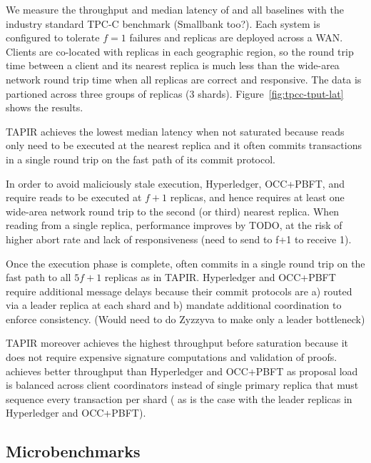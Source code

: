We measure the throughput and median latency of \sys{} and all baselines with the
industry standard TPC-C benchmark (Smallbank too?). Each system is configured to tolerate $f=1$
failures and replicas are deployed across a WAN. Clients are co-located with
replicas in each geographic region, so the round trip time between a client and
its nearest replica is much less than the wide-area network round trip time when
all replicas are correct and responsive. The data is partioned across
three groups of replicas (3 shards). Figure~\ref{fig:tpcc-tput-lat} shows the results.

TAPIR achieves the lowest median latency when not saturated because reads only
need to be executed at the nearest replica and it often commits transactions in
a single round trip on the fast path of its commit protocol.

In order to avoid maliciously stale execution, Hyperledger, OCC+PBFT, and \sys{} require reads to be executed at $f+1$ replicas, and hence requires at least one wide-area network round trip
to the second (or third) nearest replica. When reading from a single replica, performance improves by TODO, at the risk of higher abort rate and lack of responsiveness (need to send to f+1 to receive 1).

Once the execution phase is complete,
\sys{} often commits in a single round trip on the fast path to all $5f+1$
replicas as in TAPIR. Hyperledger and OCC+PBFT require additional message delays
because their commit protocols are a) routed via a leader replica at each shard and b) mandate additional coordination to enforce consistency. (Would need to do Zyzzyva to make only a leader bottleneck)

TAPIR moreover achieves the highest throughput before saturation because it does not
require expensive signature computations and validation of proofs. \sys{} achieves
better throughput than Hyperledger and OCC+PBFT as proposal load is balanced across client coordinators instead of single primary replica that must sequence every transaction per shard ( as is the case with the leader replicas in Hyperledger
and OCC+PBFT).


\subsection{Microbenchmarks}


